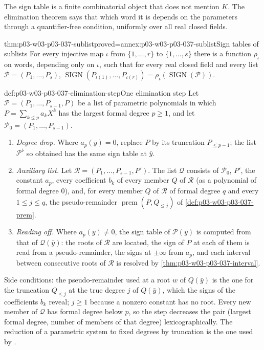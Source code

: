 The sign table is a finite combinatorial object that does not mention \(K\).
The elimination theorem says that which word it is depends on the parameters
through a quantifier-free condition, uniformly over all real closed fields.

\begin{hblemma}{thm:p03-w03-p03-037-sublist}{proved=annex:p03-w03-p03-037-sublist}{Sign tables of sublists}
For every injective map \(\iota\) from \(\{1,\dots,r\}\) to \(\{1,\dots,s\}\) there is a
function \(\rho_\iota\) on words, depending only on \(\iota\), such that for
every real closed field and every list \(\mathcal P=(P_1,\dots,P_s)\),
\(\operatorname{SIGN}(P_{\iota(1)},\dots,P_{\iota(r)})=
\rho_\iota(\operatorname{SIGN}(\mathcal P))\).
\end{hblemma}

\begin{hbmethod}{def:p03-w03-p03-037-elimination-step}{One elimination step}
Let \(\mathcal P=(P_1,\dots,P_{s-1},P)\) be a list of parametric polynomials
in which \(P=\sum_{k\leq p}a_kX^k\) has the largest formal degree
\(p\geq1\), and let \(\mathcal P_0=(P_1,\dots,P_{s-1})\).
\begin{enumerate}
\item \emph{Degree drop.}  Where \(a_p(\bar y)=0\), replace \(P\) by its
  truncation \(P_{\leq p-1}\); the list \(\mathcal P^\flat\) so obtained has
  the same sign table at \(\bar y\).
\item \emph{Auxiliary list.}  Let \(\mathcal R=(P_1,\dots,P_{s-1},P')\).  The
  list \(\mathcal Q\) consists of \(\mathcal P_0\), \(P'\), the constant
  \(a_p\), every coefficient \(b_k\) of every member \(Q\) of \(\mathcal R\)
  (as a polynomial of formal degree \(0\)), and, for every member \(Q\) of
  \(\mathcal R\) of formal degree \(q\) and every \(1\leq j\leq q\), the
  pseudo-remainder \(\operatorname{prem}(P,Q_{\leq j})\) of
  \cref{def:p03-w03-p03-037-prem}.
\item \emph{Reading off.}  Where \(a_p(\bar y)\neq0\), the sign table of
  \(\mathcal P(\bar y)\) is computed from that of \(\mathcal Q(\bar y)\):
  the roots of \(\mathcal R\) are located, the sign of \(P\) at each of them
  is read from a pseudo-remainder, the signs at \(\pm\infty\) from \(a_p\),
  and each interval between consecutive roots of \(\mathcal R\) is resolved by
  \cref{thm:p03-w03-p03-037-interval}.
\end{enumerate}
Side conditions: the pseudo-remainder used at a root \(w\) of
\(Q(\bar y)\) is the one for the truncation \(Q_{\leq j}\) at the true degree
\(j\) of \(Q(\bar y)\), which the signs of the coefficients \(b_k\) reveal;
\(j\geq1\) because a nonzero constant has no root.  Every new member of
\(\mathcal Q\) has formal degree below \(p\), so the step decreases the pair
(largest formal degree, number of members of that degree) lexicographically.
The reduction of a parametric system to fixed degrees by truncation is the
one used by \cite[p.~11]{Coste2002SAG}.
\end{hbmethod}

